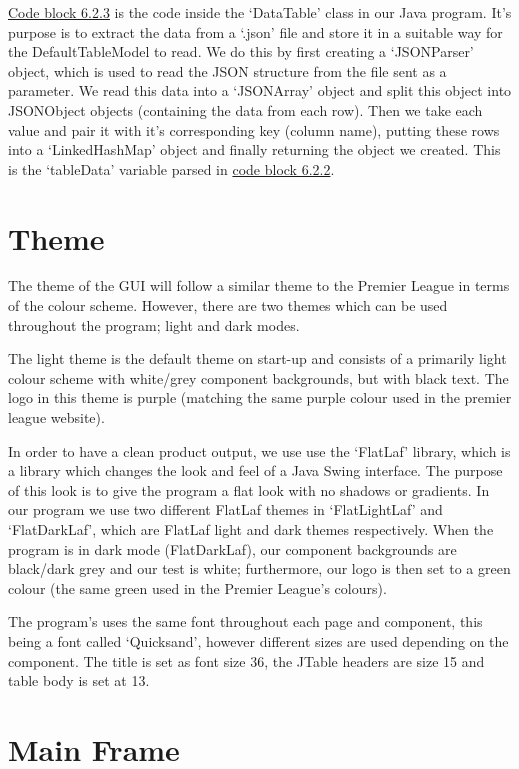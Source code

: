 \documentclass[12pt, a4paper, oneside]{book}
\numberwithin{equation}{section}
\begin{document}
\hyperref[Creating a DataTable object]{Code block 6.2.3} is the code inside the `DataTable' class in our Java program. It's purpose is to extract the data from a `.json' file and store it in a suitable way for the DefaultTableModel to read. We do this by first creating a `JSONParser' object, which is used to read the JSON structure from the file sent as a parameter. We read this data into a `JSONArray' object and split this object into JSONObject objects (containing the data from each row). Then we take each value and pair it with it's corresponding key (column name), putting these rows into a `LinkedHashMap' object and finally returning the object we created. This is the `tableData' variable parsed in \hyperref[Defining a DefaultTableModel]{code block 6.2.2}.

\section{Theme}\label{sec:6.3}

The theme of the GUI will follow a similar theme to the Premier League in terms of the colour scheme. However, there are two themes which can be used throughout the program; light and dark modes.

The light theme is the default theme on start-up and consists of a primarily light colour scheme with white/grey component backgrounds, but with black text. The logo in this theme is purple (matching the same purple colour used in the premier league website).

In order to have a clean product output, we use use the `FlatLaf' library, which is a library which changes the look and feel of a Java Swing interface. The purpose of this look is to give the program a flat look with no shadows or gradients. In our program we use two different FlatLaf themes in `FlatLightLaf' and `FlatDarkLaf', which are FlatLaf light and dark themes respectively. When the program is in dark mode (FlatDarkLaf), our component backgrounds are black/dark grey and our test is white; furthermore, our logo is then set to a green colour (the same green used in the Premier League's colours).

The program's uses the same font throughout each page and component, this being a font called `Quicksand', however different sizes are used depending on the component. The title is set as font size 36, the JTable headers are size 15 and table body is set at 13.

\section{Main Frame}\label{sec:6.4}
\end{document}
